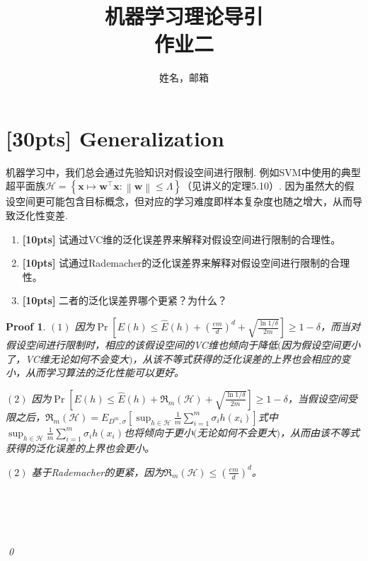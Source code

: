 \documentclass[a4paper,UTF8]{article}
\numberwithin{equation}{section}
\newtheorem*{myProof}{Proof}
\begin{document}
\renewcommand{\tilde}{\widetilde}
\renewcommand{\hat}{\widehat}

	\title{机器学习理论导引\\
		作业二}
	\author{姓名，邮箱}
	\maketitle
	
	
	\section{[30pts] Generalization}
	
	机器学习中，我们总会通过先验知识对假设空间进行限制. 例如SVM中使用的典型超平面族$\mathcal{H} = \left\lbrace \boldsymbol{x} \mapsto \boldsymbol{w}^{\top}\boldsymbol{x} : \left\| \boldsymbol{w} \right\| \leq \Lambda  \right\rbrace $（见讲义的定理5.10）. 因为虽然大的假设空间更可能包含目标概念，但对应的学习难度即样本复杂度也随之增大，从而导致泛化性变差.
	
	
	\begin{enumerate}[(1)]
		\item \textbf{[10pts]}  试通过VC维的泛化误差界来解释对假设空间进行限制的合理性。
		
		\item \textbf{[10pts]}  试通过Rademacher的泛化误差界来解释对假设空间进行限制的合理性。
		
		\item \textbf{[10pts]}	二者的泛化误差界哪个更紧？为什么？
	\end{enumerate}
	
	
	\begin{myProof}
		
		$(1)$ 因为$\Pr[E(h) \le \hat{E}(h) + \left( \frac{em}{d}\right)^d  + \sqrt{\frac{\ln 1 / \delta}{2m}}] \ge 1 - \delta$，而当对假设空间进行限制时，相应的该假设空间的VC维也倾向于降低$($因为假设空间更小了，VC维无论如何不会变大$)$，从该不等式获得的泛化误差的上界也会相应的变小，从而学习算法的泛化性能可以更好。
		
		$(2)$ 因为$\Pr[E(h) \le \hat{E}(h) + \mathfrak{R}_m(\mathcal{H})  + \sqrt{\frac{\ln 1 / \delta}{2m}}] \ge 1 - \delta$，当假设空间受限之后，$\mathfrak{R}_m(\mathcal{H}) = E_{D^m, \sigma}[\sup_{h \in \mathcal{H}}\frac{1}{m} \sum_{i=1}^m \sigma_i h(x_i) ]$式中$\sup_{h \in \mathcal{H}}\frac{1}{m} \sum_{i=1}^m \sigma_i h(x_i)$也将倾向于更小$($无论如何不会更大$)$，从而由该不等式获得的泛化误差的上界也会更小。
		
		$(2)$ 基于Rademacher的更紧，因为$\mathfrak{R}_m(\mathcal{H}) \le \left( \frac{em}{d}\right)^d$。
		
		~\\
		~\\
		~\\
		~\\
		\qed
	\end{myProof}
	\newpage
\end{document}
